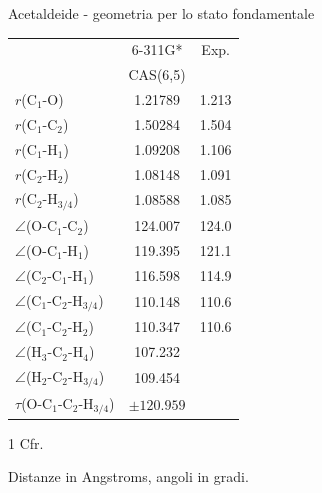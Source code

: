 \begin{center}
\begin{threeparttable}
\caption{\small Acetaldeide - geometria per lo stato fondamentale}
\label{tab:acetaldeide_geom}
\small
\begin{tabular}{|l|c|c|}
\hline
								& 6-311G*& Exp.\tnote{1} \\ %
								& CAS(6,5)& 	 \\ %
\hline
$r$(C$_1$-O)					& 1.21789		& 1.213 	\\%
$r$(C$_1$-C$_2$)				& 1.50284		& 1.504		\\%
$r$(C$_1$-H$_1$)				& 1.09208		& 1.106		\\%
$r$(C$_2$-H$_2$)				& 1.08148		& 1.091		\\
$r$(C$_2$-H$_{3/4}$)			& 1.08588		& 1.085		\\
$\angle$(O-C$_1$-C$_2$)			& 124.007		& 124.0		\\%
$\angle$(O-C$_1$-H$_1$)			& 119.395		& 121.1		\\%
$\angle$(C$_2$-C$_1$-H$_1$)		& 116.598		& 114.9		\\%
$\angle$(C$_1$-C$_2$-H$_{3/4}$)	& 110.148		& 110.6		\\%
$\angle$(C$_1$-C$_2$-H$_2$)		& 110.347		& 110.6		\\%
$\angle$(H$_3$-C$_2$-H$_4$)		& 107.232	 	&		\\%
$\angle$(H$_2$-C$_2$-H$_{3/4}$)	& 109.454 		&		\\%
$\tau$(O-C$_1$-C$_2$-H$_{3/4}$)	& $\pm120.959$	&		\\%
\hline
\end{tabular}
\begin{tablenotes}
\small
 \item[1] Cfr. \cite{jpc-97-17-1993-4293}
 \item[] Distanze in Angstroms, angoli in gradi.
\end{tablenotes}
\end{threeparttable}
\end{center}

